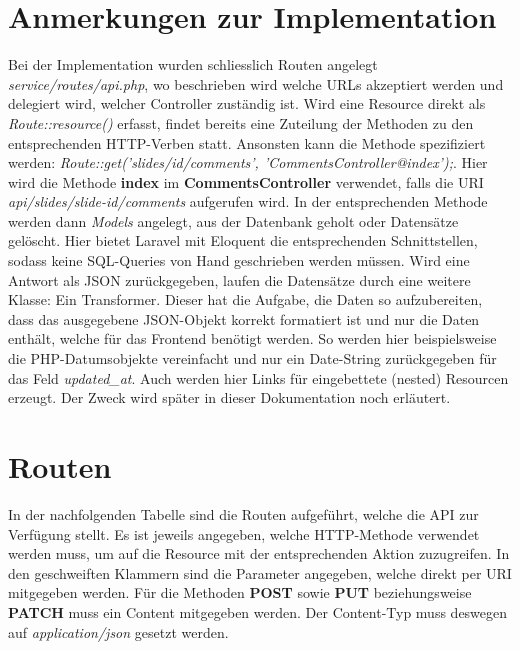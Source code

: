\section{Anmerkungen zur Implementation}
Bei der Implementation wurden schliesslich Routen angelegt \emph{service/routes/api.php}, wo beschrieben wird welche URLs akzeptiert werden und delegiert wird, welcher Controller zuständig ist. Wird eine Resource direkt als \emph{Route::resource()} erfasst, findet bereits eine Zuteilung der Methoden zu den entsprechenden HTTP-Verben statt. Ansonsten kann die Methode spezifiziert werden: \emph{Route::get('slides/{id}/comments', 'CommentsController@index');}. Hier wird die Methode \textbf{index} im \textbf{CommentsController} verwendet, falls die URI \emph{api/slides/{slide-id}/comments} aufgerufen wird. In der entsprechenden Methode werden dann \emph{Models} angelegt, aus der Datenbank geholt oder Datensätze gelöscht. Hier bietet Laravel mit Eloquent die entsprechenden Schnittstellen, sodass keine SQL-Queries von Hand geschrieben werden müssen. Wird eine Antwort als JSON zurückgegeben, laufen die Datensätze durch eine weitere Klasse: Ein Transformer. Dieser hat die Aufgabe, die Daten so aufzubereiten, dass das ausgegebene JSON-Objekt korrekt formatiert ist und nur die Daten enthält, welche für das Frontend benötigt werden. So werden hier beispielsweise die PHP-Datumsobjekte vereinfacht und nur ein Date-String zurückgegeben für das Feld \emph{updated_at}. Auch werden hier Links für eingebettete (nested) Resourcen erzeugt. Der Zweck wird später in dieser Dokumentation noch erläutert.

\section{Routen}
In der nachfolgenden Tabelle sind die Routen aufgeführt, welche die API zur Verfügung stellt. Es ist jeweils angegeben, welche HTTP-Methode verwendet werden muss, um auf die Resource mit der entsprechenden Aktion zuzugreifen. In den geschweiften Klammern sind die Parameter angegeben, welche direkt per URI mitgegeben werden. Für die Methoden \textbf{POST} sowie \textbf{PUT} beziehungsweise \textbf{PATCH} muss ein Content mitgegeben werden. Der Content-Typ muss deswegen auf \emph{application/json} gesetzt werden.

